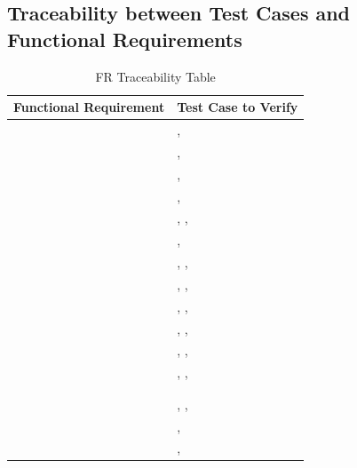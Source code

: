 \documentclass[12pt, titlepage]{article}
\begin{document}
\subsection{Traceability between Test Cases and Functional Requirements}
\begin{table}[!h]
\begin{center}
\caption {FR Traceability Table}
\label{tab:FR_Trace}
\begin{tabular}{ | m{8cm} | m{8cm} | } 
\hline
Functional Requirement & Test Case to Verify \\
\hline
\nameref{GEN_001} & \nameref{tab:STC_014}, \nameref{tab:STC_016} \\ \hline
\nameref{GEN_002} & \nameref{tab:STC_013}, \nameref{tab:STC_016} \\ \hline
\nameref{GEN_003} & \nameref{tab:STC_001}, \nameref{tab:STC_003} \\ \hline
\nameref{GEN_004} & \nameref{tab:STC_001}, \nameref{tab:STC_002} \\ \hline
\nameref{GEN_005} & \nameref{tab:STC_013}, \nameref{tab:STC_016}, \nameref{tab:STC_015} \\ \hline
\nameref{GEN_006} & \nameref{tab:STC_013}, \nameref{tab:STC_016}\\ \hline
\nameref{STA_000} & \nameref{tab:STC_001}, \nameref{tab:STC_002}, \nameref{tab:STC_003} \\ \hline
\nameref{STA_001} & \nameref{tab:STC_001}, \nameref{tab:STC_002}, \nameref{tab:STC_003} \\ \hline
\nameref{STA_003} & \nameref{tab:STC_016}, \nameref{tab:STC_012}, \nameref{tab:STC_013} \\ \hline
\nameref{STA_004} & \nameref{tab:STC_001}, \nameref{tab:STC_002}, \nameref{tab:STC_003} \\ \hline
\nameref{STA_005} & \nameref{tab:STC_001}, \nameref{tab:STC_002}, \nameref{tab:STC_003} \\ \hline
\nameref{STA_006} & \nameref{tab:STC_001}, \nameref{tab:STC_002}, \nameref{tab:STC_003} \\ \hline
\nameref{STA_008} & \nameref{tab:STC_012} \\ \hline
\nameref{STA_009} & \nameref{tab:STC_006} \\ \hline
\nameref{STA_010} & \nameref{tab:STC_008}, \nameref{tab:STC_009}, \nameref{tab:STC_010} \\ \hline
\nameref{STA_011} & \nameref{tab:STC_012}, \nameref{tab:STC_004} \\ \hline
\nameref{STA_012} & \nameref{tab:STC_001}, \nameref{tab:STC_003} \\ \hline

\end{tabular}
\end{center}
\end{table}
\end{document}
